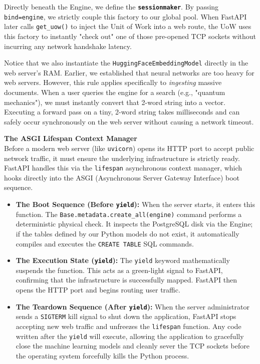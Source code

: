 Directly beneath the Engine, we define the \textbf{\texttt{sessionmaker}}. By passing \texttt{bind=engine}, we strictly couple this factory to our global pool. When FastAPI later calls \texttt{get\_uow()} to inject the Unit of Work into a web route, the UoW uses this factory to instantly "check out" one of those pre-opened TCP sockets without incurring any network handshake latency.

Notice that we also instantiate the \texttt{HuggingFaceEmbeddingModel} directly in the web server's RAM. Earlier, we established that neural networks are too heavy for web servers. However, this rule applies specifically to \textit{ingesting} massive documents. When a user queries the engine for a search (e.g., "quantum mechanics"), we must instantly convert that 2-word string into a vector. Executing a forward pass on a tiny, 2-word string takes milliseconds and can safely occur synchronously on the web server without causing a network timeout.

\textbf{The ASGI Lifespan Context Manager} \\
Before a modern web server (like \texttt{uvicorn}) opens its HTTP port to accept public network traffic, it must ensure the underlying infrastructure is strictly ready. FastAPI handles this via the \texttt{lifespan} asynchronous context manager, which hooks directly into the ASGI (Asynchronous Server Gateway Interface) boot sequence.

\begin{itemize}
    \item \textbf{The Boot Sequence (Before \texttt{yield}):} When the server starts, it enters this function. The \texttt{Base.metadata.create\_all(engine)} command performs a deterministic physical check. It inspects the PostgreSQL disk via the Engine; if the tables defined by our Python models do not exist, it automatically compiles and executes the \texttt{CREATE TABLE} SQL commands.
    \item \textbf{The Execution State (\texttt{yield}):} The \texttt{yield} keyword mathematically suspends the function. This acts as a green-light signal to FastAPI, confirming that the infrastructure is successfully mapped. FastAPI then opens the HTTP port and begins routing user traffic.
    \item \textbf{The Teardown Sequence (After \texttt{yield}):} When the server administrator sends a \texttt{SIGTERM} kill signal to shut down the application, FastAPI stops accepting new web traffic and unfreezes the \texttt{lifespan} function. Any code written after the \texttt{yield} will execute, allowing the application to gracefully close the machine learning models and cleanly sever the TCP sockets before the operating system forcefully kills the Python process.
\end{itemize}



